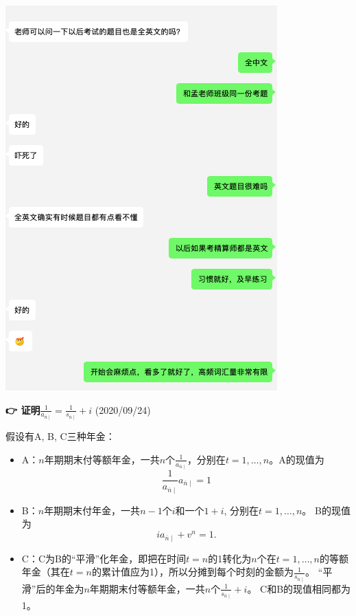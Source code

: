 \documentclass[
]{book}
\begin{document}
\begin{center}\includegraphics[width=0.8\linewidth]{./plots/english} \end{center}

\textbf{👉 证明\(\frac{1}{a_{\overline{n}\mid}}=\frac{1}{s_{\overline{n}\mid}}+i\)} (2020/09/24)

假设有A, B, C三种年金：

\begin{itemize}
\item
  A：\(n\)年期期末付等额年金，一共\(n\)个\(\frac{1}{a_{\overline{n}\mid}}\)，分别在\(t=1,\ldots,n\)。A的现值为\[\frac{1}{a_{\overline{n}\mid}} a_{\overline{n}\mid}=1\]
\item
  B：\(n\)年期期末付年金，一共\(n-1\)个\(i\)和一个\(1+i\), 分别在\(t=1,\ldots,n\)。 B的现值为\[ia_{\overline{n}\mid}+v^n=1.\]
\item
  C：C为B的``平滑''化年金，即把在时间\(t=n\)的1转化为\(n\)个在\(t=1,\ldots,n\)的等额年金（其在\(t=n\)的累计值应为1），所以分摊到每个时刻的金额为\(\frac{1}{s_{\overline{n}\mid}}\)。 ``平滑''后的年金为\(n\)年期期末付等额年金，一共\(n\)个\(\frac{1}{s_{\overline{n}\mid}}+i\)。 C和B的现值相同都为1。
\end{itemize}
\end{document}
